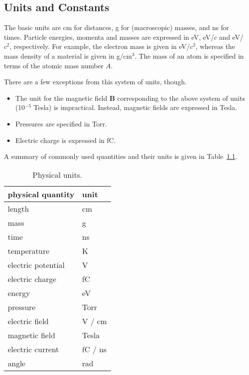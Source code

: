 \begin{appendix}
\chapter{Units and Constants}

The basic units are cm for distances, g for (macroscopic) masses, 
and ns for times. 
Particle energies, momenta and masses are expressed 
in eV, eV/\(c\) and eV/\(c^{2}\), respectively.
For example, the electron mass is given in eV/\(c^{2}\), 
whereas the mass density of a material is given in g/cm\(^{3}\). 
The mass of an atom is specified in terms of the atomic mass number \(A\).
  
There are a few exceptions from this system of units, though.
\begin{itemize}
  \item
  The unit for the magnetic field \(\mathbf{B}\) corresponding
  to the above system of units  (10\(^{-5}\) Tesla) is impractical. 
  Instead, magnetic fields are expressed in Tesla.
  \item
  Pressures are specified in Torr.
  \item
  Electric charge is expressed in fC. 
\end{itemize}
A summary of commonly used quantities and their units is given 
in Table~\ref{Tab:Units}.
\begin{table}
  \centering
  \begin{tabular}{l l}
    \toprule
    physical quantity & unit \\
    \midrule
    length & cm \\
    mass & g \\
    time & ns \\
    temperature & K \\
    electric potential & V \\
    electric charge & fC \\
    \midrule
    energy & eV \\
    pressure & Torr \\
    electric field & V / cm \\
    magnetic field & Tesla \\
    electric current & fC / ns \\
    angle & rad \\
    \bottomrule
  \end{tabular}
  \caption{Physical units.}
  \label{Tab:Units}
\end{table}
  

\end{appendix}

